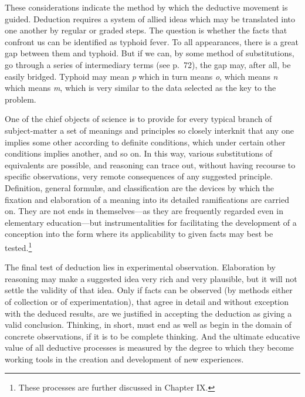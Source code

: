 \documentclass[letterpaper]{book}
\begin{document}

These considerations indicate the method by which the deductive movement
is guided. Deduction requires a system of allied ideas which may be
translated into one another by regular or graded steps. The question is
whether the facts that confront us can be identified as typhoid fever.
To all appearances, there is a great gap between them and typhoid. But
if we can, by some method of substitutions, go through a series of
intermediary terms (see p.\ 72), the gap may, after all, be easily
bridged. Typhoid may mean \emph{p} which in turn means \emph{o}, which
means \emph{n} which means \emph{m}, which is very similar to the data
selected as the key to the problem.


One of the chief objects of science is to provide for every typical
branch of subject-matter a set of meanings and principles so closely
interknit that any one implies some other according to definite
conditions, which under certain other conditions implies another, and so
on. In this way, various substitutions of equivalents are possible, and
reasoning can trace out, without having recourse to specific
observations, very remote consequences of any suggested principle.
Definition, general formulæ, and classification are the devices by which
the fixation and elaboration of a meaning into its detailed
ramifications are carried on. They are not ends in themselves---as they
are frequently regarded even in elementary education---but
instrumentalities for
facilitating
the development of a conception into the form where its applicability to
given facts may best be
tested.\footnote{These processes are further discussed in Chapter IX.}


The final test of deduction lies in experimental observation.
Elaboration by reasoning may make a suggested idea very rich and very
plausible, but it will not settle the validity of that idea. Only if
facts can be observed (by methods either of collection or of
experimentation), that agree in detail and without exception with the
deduced results, are we justified in accepting the deduction as giving a
valid conclusion. Thinking, in short, must end as well as begin in the
domain of concrete observations, if it is to be complete thinking. And
the ultimate educative value of all deductive processes is measured by
the degree to which they become working tools in the creation and
development of new experiences.
\end{document}
